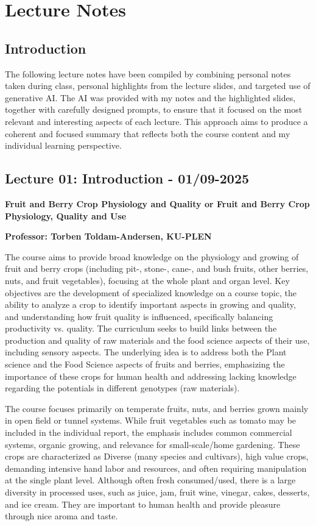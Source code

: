 \setcounter{chapter}{0}
\setcounter{section}{0}
\chapter{Lecture Notes}
\setlength{\headheight}{12.71342pt}
\addtolength{\topmargin}{-0.71342pt}

\section{Introduction}
The following lecture notes have been compiled by combining personal notes taken during class, personal highlights from the lecture slides, and targeted use of generative AI. The AI was provided with my notes and the highlighted slides, together with carefully designed prompts, to ensure that it focused on the most relevant and interesting aspects of each lecture. This approach aims to produce a coherent and focused summary that reflects both the course content and my individual learning perspective.


\section{Lecture 01: Introduction - 01/09-2025}
\textbf{Fruit and Berry Crop Physiology and Quality or Fruit and Berry Crop Physiology, Quality and Use}

\textbf{Professor: Torben Toldam-Andersen, KU-PLEN}

\vspace{1em}
The course aims to provide broad knowledge on the physiology and growing of fruit and berry crops (including pit-, stone-, cane-, and bush fruits, other berries, nuts, and fruit vegetables), focusing at the whole plant and organ level. Key objectives are the development of specialized knowledge on a course topic, the ability to analyze a crop to identify important aspects in growing and quality, and understanding how fruit quality is influenced, specifically balancing productivity vs. quality. The curriculum seeks to build links between the production and quality of raw materials and the food science aspects of their use, including sensory aspects. The underlying idea is to address both the Plant science and the Food Science aspects of fruits and berries, emphasizing the importance of these crops for human health and addressing lacking knowledge regarding the potentials in different genotypes (raw materials).

\vspace{0.5em}
The course focuses primarily on temperate fruits, nuts, and berries grown mainly in open field or tunnel systems. While fruit vegetables such as tomato may be included in the individual report, the emphasis includes common commercial systems, organic growing, and relevance for small-scale/home gardening. These crops are characterized as Diverse (many species and cultivars), high value crops, demanding intensive hand labor and resources, and often requiring manipulation at the single plant level. Although often fresh consumed/used, there is a large diversity in processed uses, such as juice, jam, fruit wine, vinegar, cakes, desserts, and ice cream. They are important to human health and provide pleasure through nice aroma and taste.

